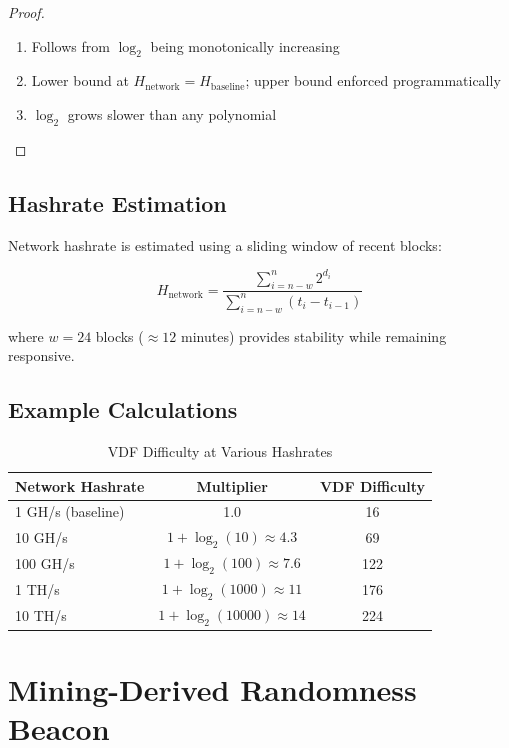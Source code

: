 \documentclass[11pt,a4paper]{article}
\begin{document}
\begin{proof}
\begin{enumerate}
    \item Follows from $\log_2$ being monotonically increasing
    \item Lower bound at $H_{\text{network}} = H_{\text{baseline}}$; upper bound enforced programmatically
    \item $\log_2$ grows slower than any polynomial
\end{enumerate}
\end{proof}

\subsection{Hashrate Estimation}

Network hashrate is estimated using a sliding window of recent blocks:

\begin{equation}
    H_{\text{network}} = \frac{\sum_{i=n-w}^{n} 2^{d_i}}{\sum_{i=n-w}^{n} (t_i - t_{i-1})}
\end{equation}

where $w = 24$ blocks ($\approx 12$ minutes) provides stability while remaining responsive.

\subsection{Example Calculations}

\begin{table}[h]
\centering
\caption{VDF Difficulty at Various Hashrates}
\begin{tabular}{lcc}
\toprule
\textbf{Network Hashrate} & \textbf{Multiplier} & \textbf{VDF Difficulty} \\
\midrule
1 GH/s (baseline) & 1.0 & 16 \\
10 GH/s & $1 + \log_2(10) \approx 4.3$ & 69 \\
100 GH/s & $1 + \log_2(100) \approx 7.6$ & 122 \\
1 TH/s & $1 + \log_2(1000) \approx 11$ & 176 \\
10 TH/s & $1 + \log_2(10000) \approx 14$ & 224 \\
\bottomrule
\end{tabular}
\end{table}

\section{Mining-Derived Randomness Beacon}
\end{document}
